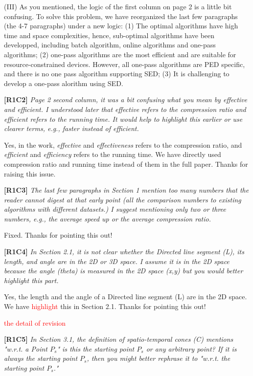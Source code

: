 \documentclass{letter}
\begin{document}
(III) As you mentioned, the logic of the first column on page 2 is a little bit confusing. To solve this problem, we have reorganized the last few paragraphs (the 4-7 paragraphs) under a new logic:  (1) The optimal algorithms have high time and space complexities, hence, sub-optimal algorithms have been developped, including batch algorithm, online algorithms and one-pass algorithms; (2) one-pass algorithms are the most efficient and are suitable for resource-constrained devices. However, all one-pass algorithms are PED specific, and there is no one pass algorithm supporting SED; (3) It is challenging to develop a one-pass alorithm using SED.


\textbf{[R1C2]} \emph{Page 2 second column, it was a bit confusing what you mean by effective and efficient. I understood later that effective refers to the compression ratio and efficient refers to the running time. It would help to highlight this earlier or use clearer terms, e.g., faster instead of efficient.}

Yes, in the work, \emph{effective} and \emph{effectiveness} refers to the compression ratio, and \emph{efficient} and \emph{efficiency} refers to the running time. We have directly used compression ratio and running time instead of them in the full paper. Thanks for raising this issue.


\textbf{[R1C3]} \emph{The last few paragraphs in Section 1 mention too many numbers that the reader cannot digest at that early point (all the comparison numbers to existing algorithms with different datasets.) I suggest mentioning only two or three numbers, e.g., the average speed up or the average compression ratio.}

Fixed. Thanks for pointing this out!

\textbf{[R1C4]} \emph{In Section 2.1, it is not clear whether the Directed line segment (L), its length, and angle are in the 2D or 3D space. I assume it is in the 2D space because the angle (theta) is measured in the 2D space (x,y) but you would better highlight this part.}

Yes, the length and the angle of a Directed line segment (L) are in the 2D space. We have \textcolor{red}{highlight} this in Section 2.1. Thanks for pointing this out!

\textcolor{red}{the detail of revision}

\textbf{[R1C5]} \emph{In Section 3.1, the definition of spatio-temporal cones (C) mentions "w.r.t. a Point $P_s$" is this the starting point $P_s$ or any arbitrary point? If it is always the starting point $P_s$, then you might better rephrase it to "w.r.t. the starting point $P_s$."}
\end{document}
